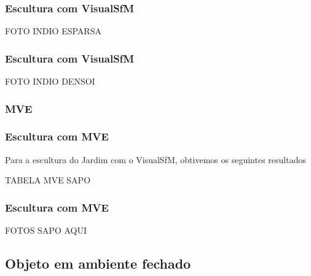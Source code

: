 \documentclass[table, usenames, svgnames, xcolor=dvipsnames]{beamer}
\begin{document}
\begin{frame}
\frametitle{\textbf{Escultura com VisualSfM}}
	FOTO INDIO ESPARSA
\end{frame}

\begin{frame}
\frametitle{\textbf{Escultura com VisualSfM}}
FOTO INDIO DENSOI
\end{frame}

\subsubsection{MVE}
\begin{frame}
	\begin{center}
	\end{center}
\end{frame}

\begin{frame}
	\begin{center}
	\end{center}
\end{frame}


\begin{frame}
\frametitle{\textbf{Escultura com MVE}}
	Para a escultura do Jardim com o VisualSfM, obtivemos os seguintes resultados
	
	TABELA MVE SAPO
\end{frame}

\begin{frame}
\frametitle{\textbf{Escultura com MVE}}
	FOTOS SAPO AQUI
\end{frame}

\subsection{Objeto em ambiente fechado}

\begin{frame}
	\begin{center}
	\end{center}
\end{frame}
\end{document}
